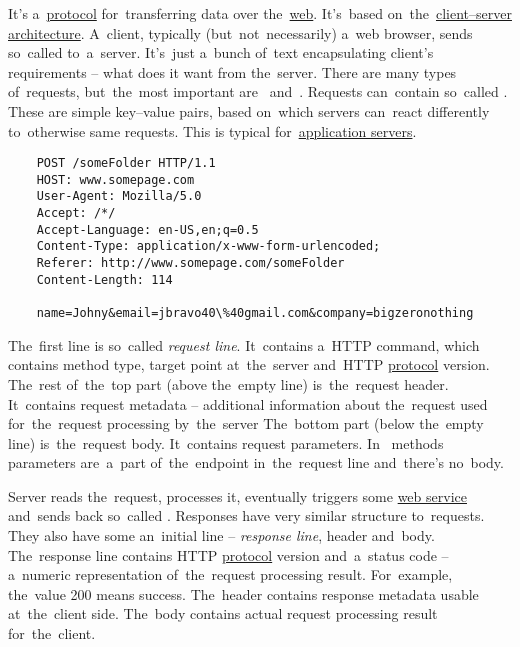 \label{networkprotocols}

\label{tcp}

\label{ip}

\label{http}
It's a~\hyperref[protocolstandard]{protocol} for~transferring data over the~\hyperref[internetweb]{web}.
It's~based on~the~\hyperref[clientserverarchitecture]{client--server architecture}.
A~client, typically (but~not~necessarily) a~web browser, sends so~called  to~a~server.
It's~just a~bunch of~text encapsulating client's requirements -- what does it want from the~server.
There are many types of~requests, but~the~most important are~ and~.
Requests can~contain so~called .
These are simple key--value pairs, based on~which servers can~react differently to~otherwise same requests.
This is typical for~\hyperref[applicationserver]{application servers}.

\begin{lstlisting}
    POST /someFolder HTTP/1.1
    HOST: www.somepage.com
    User-Agent: Mozilla/5.0
    Accept: /*/
    Accept-Language: en-US,en;q=0.5
    Content-Type: application/x-www-form-urlencoded;
    Referer: http://www.somepage.com/someFolder
    Content-Length: 114

    name=Johny&email=jbravo40\%40gmail.com&company=bigzeronothing
\end{lstlisting}

\noindent The~first line is so~called \textit{request line}.
It~contains a~HTTP command, which contains method type, target point at~the~server and~HTTP \hyperref[protocolstandard]{protocol} version.
The~rest of~the~top part (above the~empty line) is~the~request header.
It~contains request metadata -- additional information about the~request used for~the~request processing by~the~server
The~bottom part (below the~empty line) is~the~request body.
It~contains request parameters.
In~ methods parameters are~a~part of~the~endpoint in~the~request line and~there's no~body.

Server reads the~request, processes it, eventually triggers some \hyperref[webserviceapplication]{web service} and~sends back so~called .
Responses have very similar structure to~requests.
They also have some an~initial line -- \textit{response line}, header and~body.
The~response line contains HTTP \hyperref[protocolstandard]{protocol} version and~a~status code --  a~numeric representation of~the~request processing result.
For~example, the~value 200 means success.
The~header contains response metadata usable at~the~client side.
The~body contains actual request processing result for~the~client.

